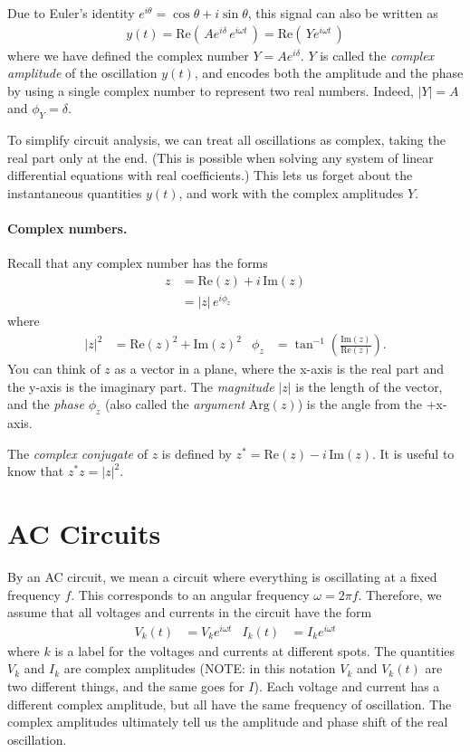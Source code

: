 \documentclass[11pt]{article}
\begin{document}
Due to Euler's identity $e^{i\theta} = \cos\theta + i\sin\theta$, this signal can also be written as
\begin{align*}
y(t) = \text{Re} \left( \, A e^{i\delta} \, e^{i\omega t}  \, \right)
   = \text{Re} \left( \, Y e^{i\omega t}  \, \right)
\end{align*}
where we have defined the complex number $Y = A e^{i\delta}$. $Y$ is called the \textit{complex amplitude} of the oscillation $y(t)$, and encodes both the amplitude and the phase by using a single complex number to represent two real numbers. Indeed, $|Y| = A$ and $\phi_Y = \delta$.

To simplify circuit analysis, we can treat all oscillations as complex, taking the real part only at the end. (This is possible when solving any system of linear differential equations with real coefficients.) This lets us forget about the instantaneous quantities $y(t)$, and work with the complex amplitudes $Y$.


\paragraph*{Complex numbers.} Recall that any complex number has the forms
\begin{align*}
 z &= \text{Re}(z) + i \, \text{Im}(z) \\
    & = |z| \, e^{i\phi_z}
\end{align*}
where
\begin{align*}
|z|^2 &= \text{Re}(z)^2 +  \text{Im}(z)^2
&
\phi_z &= \tan^{-1} \left( \tfrac{\text{Im}(z)}{ \text{Re}(z)} \right).
\end{align*}
You can think of $z$ as a vector in a plane, where the x-axis is the real part and the y-axis is the imaginary part. The \textit{magnitude} $|z|$ is the length of the vector, and the \textit{phase} $\phi_z$ (also called the \textit{argument} $\text{Arg}(z)$) is the angle from the +x-axis.

The \textit{complex conjugate} of $z$ is defined by $z^* = \text{Re}(z) - i \, \text{Im}(z)$. It is useful to know that $z^* z = |z|^2$.



\section*{AC Circuits}
By an AC circuit, we mean a circuit where everything is oscillating at a fixed frequency $f$. This corresponds to an angular frequency $\omega = 2\pi f$. Therefore, we assume that all voltages and currents in the circuit have the form
\begin{align*}
V_k(t) &= V_k e^{i\omega t}  &  I_k(t) &= I_k e^{i\omega t}
\end{align*}
where $k$ is a label for the voltages and currents at different spots. The quantities $V_k$ and $I_k$ are complex amplitudes (NOTE: in this notation $V_k$ and $V_k(t)$ are two different things, and the same goes for $I$). Each voltage and current has a different complex amplitude, but all have the same frequency of oscillation. The complex amplitudes ultimately tell us the amplitude and phase shift of the real oscillation.
\end{document}
